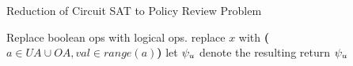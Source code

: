 \begin{algorithm}
	\caption{ Reduction of Circuit SAT to Policy Review Problem}
	\label{alg:reduction}
	\begin{algorithmic}[1]
		\State Replace boolean ops with logical ops.
		\State replace $x$ with \textbf{\E($a \in UA \cup OA, val \in range(a)$) } 
		\EndFor
		\State let $\psi_{u}$ denote the resulting \userAttrExpr		
		\State return $\psi_{u}$ 	
		\EndProcedure
	\end{algorithmic}
\end{algorithm}
